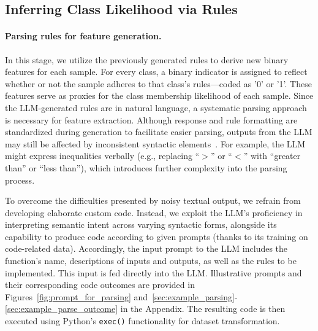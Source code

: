 \subsection{Inferring Class Likelihood via Rules}
\label{Sec:training}

\paragraph{Parsing rules for feature generation.} In this stage, we utilize the previously generated rules to derive new binary features for each sample. For every class, a binary indicator is assigned to reflect whether or not the sample adheres to that class's rules—coded as '0' or '1'. These features serve as proxies for the class membership likelihood of each sample. Since the LLM-generated rules are in natural language, a systematic parsing approach is necessary for feature extraction. Although response and rule formatting are standardized during generation to facilitate easier parsing, outputs from the LLM may still be affected by inconsistent syntactic elements~\cite{kovavc2023large}. For example, the LLM might express inequalities verbally (e.g., replacing ``$>$” or ``$<$” with ``greater than'' or ``less than''), which introduces further complexity into the parsing process.

To overcome the difficulties presented by noisy textual output, we refrain from developing elaborate custom code. Instead, we exploit the LLM's proficiency in interpreting semantic intent across varying syntactic forms, alongside its capability to produce code according to given prompts (thanks to its training on code-related data). Accordingly, the input prompt to the LLM includes the function’s name, descriptions of inputs and outputs, as well as the rules to be implemented. This input is fed directly into the LLM. Illustrative prompts and their corresponding code outcomes are provided in Figures~\ref{fig:prompt_for_parsing} and~\ref{sec:example_parsing}-\ref{sec:example_parse_outcome} in the Appendix. The resulting code is then executed using Python’s \texttt{exec()} functionality for dataset transformation.

\vspace*{-0.12in}
